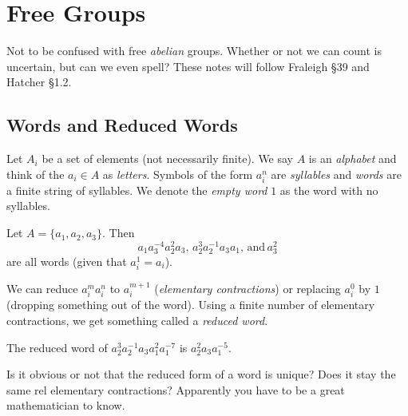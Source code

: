 \section{Free Groups}
Not to be confused with free \emph{abelian} groups. Whether or not we can count is uncertain, but can we even spell? These notes will follow Fraleigh \S 39 and Hatcher \S 1.2.
\subsection{Words and Reduced Words}
Let $A_i$ be a set of elements (not necessarily finite). We say $A$ is an \emph{alphabet} and think of the $a_i\in A$ as \emph{letters}. Symbols of the form $a_{i}^{n}$ are \emph{syllables} and \emph{words} are a finite string of syllables. We denote the \emph{empty word} $1$ as the word with no syllables.
\begin{example}
    Let $A=\{a_1,a_2,a_3\}.$ Then \[
        a_1a_3^{-4}a_2^{2}a_3, \, a_2^{3}a_2^{-1}a_3a_1, \, \text{and} \, a_3^2
    \] are all words (given that $a_i^{1}=a_i$).
\end{example}
We can reduce $a_i^{m}a_i^n$ to $a_i^{m+1}$ (\emph{elementary contractions}) or replacing $a_i^{0}$ by $1$ (dropping something out of the word). Using a finite number of elementary contractions, we get something called a \emph{reduced word}.
\begin{example}
    The reduced word of $a_2^{3}a_2^{-1}a_3a_1^2a_1^{-7}$ is $a_2^2a_3a_1^{-5}$.
\end{example}
Is it obvious or not that the reduced form of a word is unique? Does it stay the same rel elementary contractions? Apparently you have to be a great mathematician to know.
